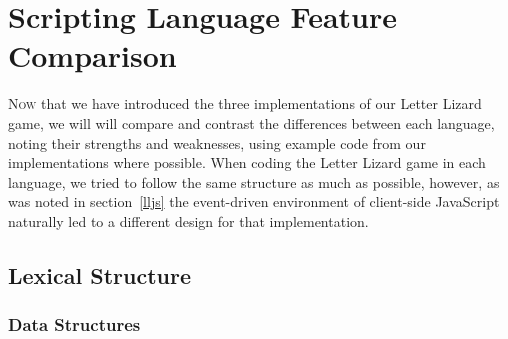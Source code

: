 \section{Scripting Language Feature Comparison}
\label{comparison}









\lettrine[nindent=0em,lines=3]{N}{ow} that we have introduced the three implementations of
our Letter Lizard game, we will will compare and contrast the differences between
each language, noting their strengths and weaknesses, using example code from our
implementations where possible. When coding the Letter Lizard game in each language,
we tried to follow the same structure as much as possible, however, as was noted in section~\ref{lljs}
the event-driven environment of client-side JavaScript naturally led to a different
design for that implementation. 

\subsection{Lexical Structure}

\subsubsection{Data Structures}


